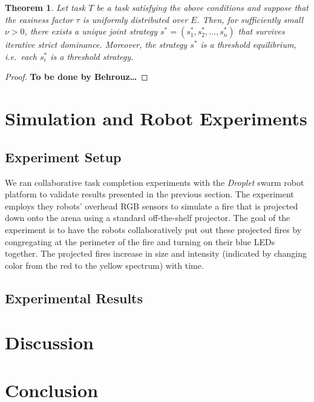 \documentclass[conference]{ieeeconf}
\newtheorem{theorem}{Theorem}
\begin{document}
\begin{theorem}
Let task $T$ be a task satisfying the above conditions and suppose that the easiness factor $\tau$ is uniformly distributed over $E$. Then, for sufficiently small $\nu>0$, there exists a unique joint strategy $s^*=(s_1^*,s_2^*,\ldots,s_n^*)$ that survives iterative strict dominance. Moreover, the strategy $s^*$ is a threshold equilibrium, i.e.\ each $s_i^*$ is a threshold strategy.
\end{theorem}

\begin{proof}
\textbf{To be done by Behrouz\ldots}
\end{proof}




\section{Simulation and Robot Experiments}\label{sec:exp}
\subsection{Experiment Setup}\label{sec:expsetup}
We ran collaborative task completion experiments with the \emph{Droplet} swarm robot platform to validate results presented in the previous section. The experiment employs they robots' overhead RGB sensors to simulate a fire that is projected down onto the arena using a standard off-the-shelf projector. The goal of the experiment is to have the robots collaboratively put out these projected fires by congregating at the perimeter of the fire and turning on their blue LEDs together. The projected fires increase in size and intensity (indicated by changing color from the red to the yellow spectrum) with time.

\subsection{Experimental Results}\label{sec:expresults}




\section{Discussion}\label{sec:disc}




\section{Conclusion}\label{sec:conc}





\end{document}
